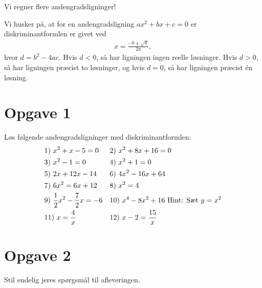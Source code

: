 
\begin{center}
\Huge
Vi regner flere andengradsligninger!
\end{center}

Vi husker på, at for en andengradsligning $ax^2+bx+c=0$ er diskriminantformlen er givet ved
\begin{align*}
x = \frac{-b\pm \sqrt{d}}{2a},
\end{align*}
hvor $d= b^2-4ac$. Hvis $d<0$, så har ligningen ingen reelle løsninger. Hvis $d>0$, så har ligningen præcist to løsninger, og hvis $d=0$, så har ligningen præcist én løsning. 
\section*{Opgave 1}
Løs følgende andengradsligninger med diskriminantformlen:
\begin{align*}
&1) \ x^2+x-5 =0   &&2) \  x^2+8x+16 = 0  \\
&3) \ x^2-1 = 0  &&4) \ x^2+1=0  \\
&5) \ 2x+12x-14 &&6) \  4x^2-16x+64   \\
&7) \  6x^2=6x+12  &&8) \  x^2=4  \\
&9) \  \frac{1}{2}x^2 -\frac{7}{2}x=-6  &&10) \ x^4 - 8x^2+16 \textnormal{ Hint: Sæt } y=x^2   \\
&11) \  x = \frac{4}{x}  && 12) \    x-2 = \frac{15}{x}   
\end{align*}

\section*{Opgave 2}
Stil endelig jeres spørgsmål til afleveringen.